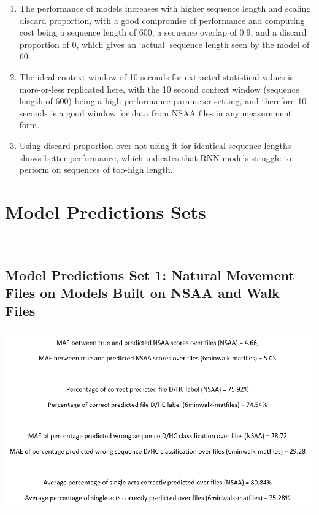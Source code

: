 \documentclass[12pt,twoside]{report}
\begin{document}
\begin{enumerate}
	\item The performance of models increases with higher sequence length and scaling discard proportion, with a good compromise of performance and computing cost being a sequence length of 600, a sequence overlap of 0.9, and a discard proportion of 0, which gives an ‘actual’ sequence length seen by the model of 60.
	\item The ideal context window of 10 seconds for extracted statistical values is more-or-less replicated here, with the 10 second context window (sequence length of 600) being a high-performance parameter setting, and therefore 10 seconds is a good window for data from NSAA files in any measurement form.
	\item Using discard proportion over not using it for identical sequence lengths shows better performance, which indicates that RNN models struggle to perform on sequences of too-high length.
\end{enumerate}











\chapter{Model Predictions Sets\\~\\}



\section{Model Predictions Set 1: Natural Movement Files on Models Built on NSAA and Walk Files}

\begin{center}
\includegraphics[scale=0.5]{project_figures/fig11_1}
\end{center}
\end{document}
